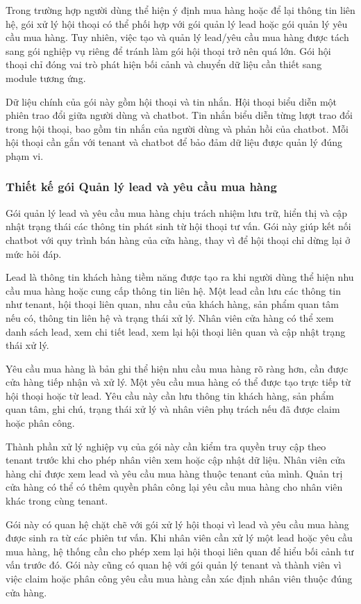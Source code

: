 \documentclass[../DoAn.tex]{subfiles}
\begin{document}
Trong trường hợp người dùng thể hiện ý định mua hàng hoặc để lại thông tin liên hệ, gói xử lý hội thoại có thể phối hợp với gói quản lý lead hoặc gói quản lý yêu cầu mua hàng. Tuy nhiên, việc tạo và quản lý lead/yêu cầu mua hàng được tách sang gói nghiệp vụ riêng để tránh làm gói hội thoại trở nên quá lớn. Gói hội thoại chỉ đóng vai trò phát hiện bối cảnh và chuyển dữ liệu cần thiết sang module tương ứng.

Dữ liệu chính của gói này gồm hội thoại và tin nhắn. Hội thoại biểu diễn một phiên trao đổi giữa người dùng và chatbot. Tin nhắn biểu diễn từng lượt trao đổi trong hội thoại, bao gồm tin nhắn của người dùng và phản hồi của chatbot. Mỗi hội thoại cần gắn với tenant và chatbot để bảo đảm dữ liệu được quản lý đúng phạm vi.

\subsubsection{Thiết kế gói Quản lý lead và yêu cầu mua hàng}

Gói quản lý lead và yêu cầu mua hàng chịu trách nhiệm lưu trữ, hiển thị và cập nhật trạng thái các thông tin phát sinh từ hội thoại tư vấn. Gói này giúp kết nối chatbot với quy trình bán hàng của cửa hàng, thay vì để hội thoại chỉ dừng lại ở mức hỏi đáp.

Lead là thông tin khách hàng tiềm năng được tạo ra khi người dùng thể hiện nhu cầu mua hàng hoặc cung cấp thông tin liên hệ. Một lead cần lưu các thông tin như tenant, hội thoại liên quan, nhu cầu của khách hàng, sản phẩm quan tâm nếu có, thông tin liên hệ và trạng thái xử lý. Nhân viên cửa hàng có thể xem danh sách lead, xem chi tiết lead, xem lại hội thoại liên quan và cập nhật trạng thái xử lý.

Yêu cầu mua hàng là bản ghi thể hiện nhu cầu mua hàng rõ ràng hơn, cần được cửa hàng tiếp nhận và xử lý. Một yêu cầu mua hàng có thể được tạo trực tiếp từ hội thoại hoặc từ lead. Yêu cầu này cần lưu thông tin khách hàng, sản phẩm quan tâm, ghi chú, trạng thái xử lý và nhân viên phụ trách nếu đã được claim hoặc phân công.

Thành phần xử lý nghiệp vụ của gói này cần kiểm tra quyền truy cập theo tenant trước khi cho phép nhân viên xem hoặc cập nhật dữ liệu. Nhân viên cửa hàng chỉ được xem lead và yêu cầu mua hàng thuộc tenant của mình. Quản trị cửa hàng có thể có thêm quyền phân công lại yêu cầu mua hàng cho nhân viên khác trong cùng tenant.

Gói này có quan hệ chặt chẽ với gói xử lý hội thoại vì lead và yêu cầu mua hàng được sinh ra từ các phiên tư vấn. Khi nhân viên cần xử lý một lead hoặc yêu cầu mua hàng, hệ thống cần cho phép xem lại hội thoại liên quan để hiểu bối cảnh tư vấn trước đó. Gói này cũng có quan hệ với gói quản lý tenant và thành viên vì việc claim hoặc phân công yêu cầu mua hàng cần xác định nhân viên thuộc đúng cửa hàng.
\end{document}
